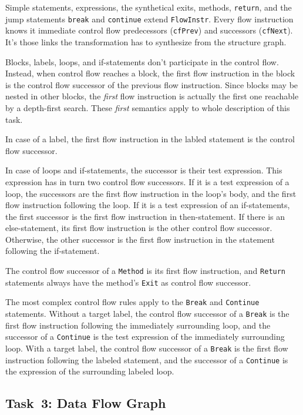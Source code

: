 \documentclass[submission]{eptcs}
\begin{document}
Simple statements, expressions, the synthetical exits, methods, \verb|return|,
and the jump statements \verb|break| and \verb|continue| extend
\verb|FlowInstr|.  Every flow instruction knows it immediate control flow
predecessors (\verb|cfPrev|) and successors (\verb|cfNext|).  It's those links
the transformation has to synthesize from the structure graph.

Blocks, labels, loops, and if-statements don't participate in the control flow.
Instead, when control flow reaches a block, the first flow instruction in the
block is the control flow successor of the previous flow instruction.  Since
blocks may be nested in other blocks, the \emph{first} flow instruction is
actually the first one reachable by a depth-first search.  These \emph{first}
semantics apply to whole description of this task.

In case of a label, the first flow instruction in the labled statement is the
control flow successor.

In case of loops and if-statements, the successor is their test expression.
This expression has in turn two control flow successors.  If it is a test
expression of a loop, the successors are the first flow instruction in the
loop's body, and the first flow instruction following the loop.  If it is a
test expression of an if-statements, the first successor is the first flow
instruction in then-statement.  If there is an else-statement, its first flow
instruction is the other control flow successor.  Otherwise, the other
successor is the first flow instruction in the statement following the
if-statement.

The control flow successor of a \verb|Method| is its first flow instruction,
and \verb|Return| statements always have the method's \verb|Exit| as control
flow successor.

The most complex control flow rules apply to the \verb|Break| and
\verb|Continue| statements.  Without a target label, the control flow successor
of a \verb|Break| is the first flow instruction following the immediately
surrounding loop, and the successor of a \verb|Continue| is the test expression
of the immediately surrounding loop.  With a target label, the control flow
successor of a \verb|Break| is the first flow instruction following the labeled
statement, and the successor of a \verb|Continue| is the expression of the
surrounding labeled loop.


\subsection{Task~3: Data Flow Graph}
\label{sec:task3-df-graph}
\end{document}
